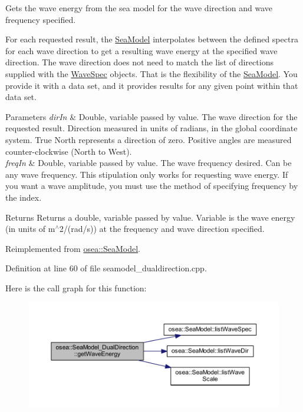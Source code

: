 Gets the wave energy from the sea model for the wave direction and wave frequency specified. 

For each requested result, the \hyperlink{classosea_1_1_sea_model}{Sea\-Model} interpolates between the defined spectra for each wave direction to get a resulting wave energy at the specified wave direction. The wave direction does not need to match the list of directions supplied with the \hyperlink{classosea_1_1_wave_spec}{Wave\-Spec} objects. That is the flexibility of the \hyperlink{classosea_1_1_sea_model}{Sea\-Model}. You provide it with a data set, and it provides results for any given point within that data set. 
\begin{DoxyParams}{Parameters}
{\em dir\-In} & Double, variable passed by value. The wave direction for the requested result. Direction measured in units of radians, in the global coordinate system. True North represents a direction of zero. Positive angles are measured counter-\/clockwise (North to West). \\
\hline
{\em freq\-In} & Double, variable passed by value. The wave frequency desired. Can be any wave frequency. This stipulation only works for requesting wave energy. If you want a wave amplitude, you must use the method of specifying frequency by the index. \\
\hline
\end{DoxyParams}
\begin{DoxyReturn}{Returns}
Returns a double, variable passed by value. Variable is the wave energy (in units of m$^\wedge$2/(rad/s)) at the frequency and wave direction specified. 
\end{DoxyReturn}


Reimplemented from \hyperlink{classosea_1_1_sea_model_abd444caa08206c2f3b2002e614f0b2fc}{osea\-::\-Sea\-Model}.



Definition at line 60 of file seamodel\-\_\-dualdirection.\-cpp.



Here is the call graph for this function\-:
\nopagebreak
\begin{figure}[H]
\begin{center}
\leavevmode
\includegraphics[width=350pt]{classosea_1_1_sea_model___dual_direction_a3fdec50d9c1e58f35c3191b5b66f3845_cgraph}
\end{center}
\end{figure}




